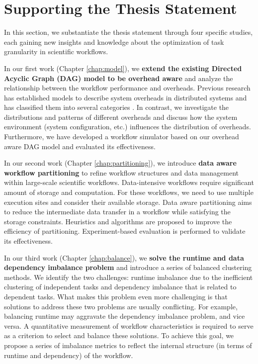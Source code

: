 \section{Supporting the Thesis Statement}

In this section, we substantiate the thesis statement through four specific studies, each gaining new insights and knowledge about the optimization of task granularity in scientific workflows. 

In our first work \cite{Chen2011} (Chapter \ref{chap:model}), we \textbf{extend the existing Directed Acyclic Graph (DAG) model to be overhead aware} and analyze the relationship between the workflow performance and overheads. Previous research has established models to describe system overheads in distributed systems and has classified them into several categories \cite{Prodan2007, Prodan2008}. In contrast, we investigate the distributions and patterns of different overheads and discuss how the system environment (system configuration, etc.) influences the distribution of overheads. Furthermore, we have developed a workflow simulator based on our overhead aware DAG model and evaluated its effectiveness. 

In our second work \cite{Integration2012, Chen2011a} (Chapter \ref{chap:partitioning}), we introduce \textbf{data aware workflow partitioning} to refine workflow structures and data management within large-scale scientific workflows. Data-intensive workflows require significant amount of storage and computation. For these workflows, we need to use multiple execution sites and consider their available storage. Data aware partitioning aims to reduce the intermediate data transfer in a workflow while satisfying the storage constraints. Heuristics and algorithms are proposed to improve the efficiency of partitioning. Experiment-based evaluation is performed to validate its effectiveness.  

In our third work \cite{Chen2013a,Chen2013b} (Chapter \ref{chap:balance}), we \textbf{solve the runtime and data dependency imbalance problem} and introduce a series of balanced clustering methods. 
We identify the two challenges: runtime imbalance due to the inefficient clustering of independent tasks and dependency imbalance that is related to dependent tasks. What makes this problem even more challenging is that solutions to address these two problems are usually conflicting. For example, balancing runtime may aggravate the dependency imbalance problem, and vice versa. A quantitative measurement of workflow characteristics is required to serve as a criterion to select and balance these solutions. To achieve this goal, we propose a series of imbalance metrics to reflect the internal structure (in terms of runtime and dependency) of the workflow. 

